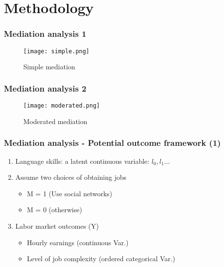 \documentclass{beamer}
\begin{document}
\section{Methodology}

\begin{frame}
\frametitle{Mediation analysis 1}

\begin{figure}
\centering
\texttt{[image: simple.png]}
\caption{Simple mediation}
\end{figure}

\end{frame}

\begin{frame}
\frametitle{Mediation analysis 2}

\begin{figure}
\centering
\texttt{[image: moderated.png]}
\caption{Moderated mediation}
\end{figure}

\end{frame}
       

\begin{frame}
\frametitle{Mediation analysis - Potential outcome framework (1)}
\begin{enumerate}

\item Language skills: a latent continuous variable: $l_{0}, l_{1}$... \\

\item Assume two choices of obtaining jobs
\begin{itemize}
\item M = 1 (Use social networks)
\item M = 0 (otherwise)
\end{itemize}

\item Labor market outcomes (Y)
\begin{itemize}
\item Hourly earnings (continuous Var.)
\item Level of job complexity (ordered categorical Var.)
\end{itemize}

\end{enumerate}

\end{frame}
\end{document}
